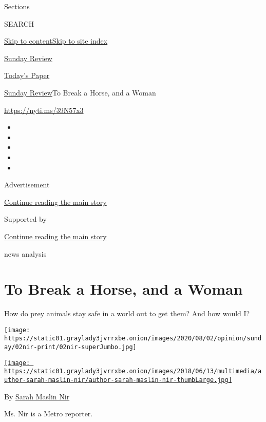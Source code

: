 Sections

SEARCH

\protect\hyperlink{site-content}{Skip to
content}\protect\hyperlink{site-index}{Skip to site index}

\href{https://www.nytimes3xbfgragh.onion/section/opinion/sunday}{Sunday
Review}

\href{https://myaccount.nytimes3xbfgragh.onion/auth/login?response_type=cookie\&client_id=vi}{}

\href{https://www.nytimes3xbfgragh.onion/section/todayspaper}{Today's
Paper}

\href{/section/opinion/sunday}{Sunday Review}\textbar{}To Break a Horse,
and a Woman

\href{https://nyti.ms/39N57x3}{https://nyti.ms/39N57x3}

\begin{itemize}
\item
\item
\item
\item
\item
\end{itemize}

Advertisement

\protect\hyperlink{after-top}{Continue reading the main story}

Supported by

\protect\hyperlink{after-sponsor}{Continue reading the main story}

news analysis

\hypertarget{to-break-a-horse-and-a-woman}{%
\section{To Break a Horse, and a
Woman}\label{to-break-a-horse-and-a-woman}}

How do prey animals stay safe in a world out to get them? And how would
I?

\texttt{[image: https://static01.graylady3jvrrxbe.onion/images/2020/08/02/opinion/sunday/02nir-print/02nir-superJumbo.jpg]}

\href{https://www.nytimes3xbfgragh.onion/by/sarah-maslin-nir}{\texttt{[image: https://static01.graylady3jvrrxbe.onion/images/2018/06/13/multimedia/author-sarah-maslin-nir/author-sarah-maslin-nir-thumbLarge.jpg]}}

By \href{https://www.nytimes3xbfgragh.onion/by/sarah-maslin-nir}{Sarah
Maslin Nir}

Ms. Nir is a Metro reporter.

